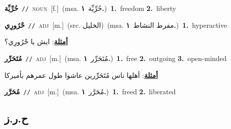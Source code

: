 \documentclass[10pt,a4paper,twoside]{article} %
\begin{document}
\begin{multicols}{2}
{\setlength\topsep{0pt}\textbf{\foreignlanguage{arabic}{حُرِّيِّة}}\ {\color{gray}\texttt{//}\color{black}}\ \textsc{noun}\ [f.]\ \color{gray}(msa. \foreignlanguage{arabic}{حُرِّيِّة}~\foreignlanguage{arabic}{\textbf{١.}})\color{black}\ \textbf{1.}~freedom  \textbf{2.}~liberty\ } \vspace{2mm}

{\setlength\topsep{0pt}\textbf{\foreignlanguage{arabic}{حْرُورِي}}\ {\color{gray}\texttt{//}\color{black}}\ \textsc{adj}\ [m.]\ (src. \color{gray}\foreignlanguage{arabic}{الخليل}\color{black})\ \color{gray}(msa. \foreignlanguage{arabic}{مفرط النشاط}~\foreignlanguage{arabic}{\textbf{١.}})\color{black}\ \textbf{1.}~hyperactive\  \begin{flushright}\color{gray}\foreignlanguage{arabic}{\textbf{\underline{\foreignlanguage{arabic}{أمثلة}}}: ايش يا حْرُورِي؟}\end{flushright}\color{black}} \vspace{2mm}

{\setlength\topsep{0pt}\textbf{\foreignlanguage{arabic}{مُتَحَرِّر}}\ {\color{gray}\texttt{//}\color{black}}\ \textsc{adj}\ [m.]\ \color{gray}(msa. \foreignlanguage{arabic}{مُتَحَرِّر}~\foreignlanguage{arabic}{\textbf{١.}})\color{black}\ \textbf{1.}~free  \textbf{2.}~outgoing  \textbf{3.}~open-minded\  \begin{flushright}\color{gray}\foreignlanguage{arabic}{\textbf{\underline{\foreignlanguage{arabic}{أمثلة}}}: أهلها ناس مُتَحَرِّرين عاشوا طول عمرهم بأميركا}\end{flushright}\color{black}} \vspace{2mm}

{\setlength\topsep{0pt}\textbf{\foreignlanguage{arabic}{مُحَرَّر}}\ {\color{gray}\texttt{//}\color{black}}\ \textsc{adj}\ [m.]\ \color{gray}(msa. \foreignlanguage{arabic}{مُحَرَّر}~\foreignlanguage{arabic}{\textbf{١.}})\color{black}\ \textbf{1.}~freed  \textbf{2.}~liberated\ } \vspace{2mm}

\vspace{-3mm}
\subsection*{\color{blue}\foreignlanguage{arabic}{ح.ر.ز}\color{blue}{}} 


\end{multicols}
\end{document}
